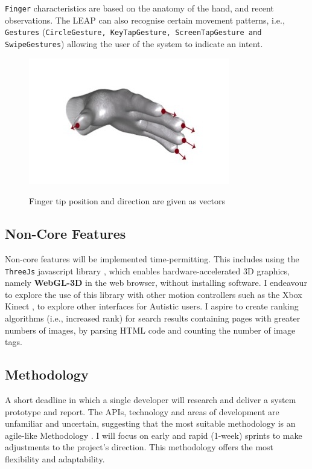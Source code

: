 \documentclass[a4paper, 11pt]{article}
\begin{document}
\begin{justify}
\texttt{Finger} characteristics are based on the anatomy of the hand, and recent observations. The LEAP can also recognise certain movement patterns, i.e., \texttt{Gestures} (\texttt{CircleGesture, KeyTapGesture, ScreenTapGesture and SwipeGestures}) allowing the user of the system to indicate an intent.

\begin{figure}[H]
\begin{center}
\includegraphics[scale=0.4]{fingers}\\
\caption{Finger tip position and direction are given as vectors \cite{leap}}
\end{center}
\end{figure}


\subsection{Non-Core Features}
Non-core features will be implemented time-permitting. This includes using the \texttt{ThreeJs} javascript library \cite{threejs, javascript}, which enables hardware-accelerated 3D graphics, namely \textbf{WebGL-3D} in the web browser, without installing software. I endeavour to explore the use of this library with other motion controllers such as the Xbox Kinect \cite{kinect}, to explore other interfaces for Autistic users. I aspire to create ranking algorithms (i.e., increased rank) for search results containing pages with greater numbers of images, by parsing HTML code and counting the number of image tags.


\subsection{Methodology}
A short deadline in which a single developer will research and deliver a system prototype and report. The APIs, technology and areas of development are unfamiliar and uncertain, suggesting that the most suitable methodology is an agile-like Methodology \cite{agile}. I will focus on early and rapid (1-week) sprints to make adjustments to the project's direction. This methodology offers the most flexibility and adaptability.



\end{justify}
\end{document}
